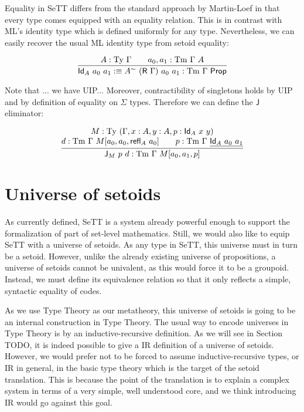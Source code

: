 \documentclass{easychair}
\newcommand{\refl}{\textsf{refl}}
\newcommand{\GG}{\Gamma}
\newcommand{\R}{\textsf{R}}
\newcommand{\Id}{\textsf{Id}}
\newcommand{\J}{\textsf{J}}
\newcommand{\tyj}[2]{#2 : \Ty\ #1}
\newcommand{\tmj}[3]{#2 : \Tm\ #1\ #3}
\newcommand{\Prop}{\textsf{Prop}}
\newcommand{\Ty}{\mathrm{Ty}}
\newcommand{\Tm}{\mathrm{Tm}}
\begin{document}
Equality in SeTT differs from the standard approach by Martin-Loef in that every
type comes equipped with an equality relation. This is in contrast with ML's
identity type which is defined uniformly for any type.
%
Nevertheless, we can easily recover the usual ML identity type from setoid
equality:

\[
\infer{
  \textsf{Id}_A\ a_0\ a_1 :\equiv A^{\sim}\ (\R\ \GG)\ a_0\ a_1 : \Tm\ \GG\ \Prop
}{
  \tyj{\GG}{A} \qquad \tmj{\GG}{a_0, a_1}{A}
}
\]

Note that ... we have UIP... Moreover, contractibility of singletons holds by
UIP and by definition of equality on $\Sigma$ types. Therefore we can define the
$\J$ eliminator:

\[
\infer{
  \tmj{\GG}{\J_M\ p\ d}{M[a_0, a_1, p]}
}{
  \deduce{
    \tmj{\GG}{d}{M[a_0, a_0, \refl_A\ a_0]}
    \qquad
    \tmj{\GG}{p}{\underline{\Id_A\ a_0\ a_1}}
  }{
  \tyj{(\GG, x : A, y : A, p : \Id_A\ x\ y)}{M}
  }
}
\]


\section{Universe of setoids}



As currently defined, SeTT is a system already powerful enough to support the
formalization of part of set-level mathematics. Still, we would also like to
equip SeTT with a universe of setoids. As any type in SeTT, this universe must
in turn be a setoid. However, unlike the already existing universe of
propositions, a universe of setoids cannot be univalent, as this would force it
to be a groupoid. Instead, we must define its equivalence relation so that it
only reflects a simple, syntactic equality of codes.

As we use Type Theory as our metatheory, this universe of setoids is going to be
an internal construction in Type Theory. The usual way to encode universes in
Type Theory is by an inductive-recursive definition. As we will see in Section
TODO, it is indeed possible to give a IR definition of a universe of setoids.
%
However, we would prefer not to be forced to assume inductive-recursive types,
or IR in general, in the basic type theory which is the target of the setoid
translation. This is because the point of the translation is to explain a
complex system in terms of a very simple, well understood core, and we think
introducing IR would go against this goal.
\end{document}
